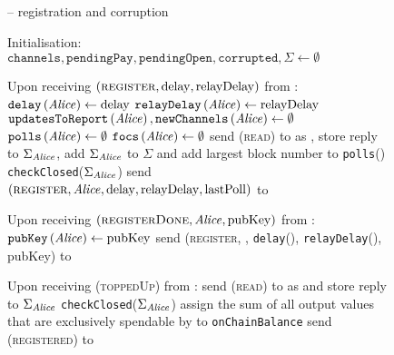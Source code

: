   \begin{figure}[H]
    \begin{systembox}{\fpaynet{} -- registration and corruption}
      \begin{algorithmic}[1]
        \State Initialisation:
        \Indent
          \State $\mathtt{channels}, \mathtt{pendingPay}, \mathtt{pendingOpen},
          \mathtt{corrupted}, \Sigma \gets \emptyset$
        \EndIndent
        \Statex

        \State Upon receiving $\left(\textsc{register}, \mathrm{delay},
        \mathrm{relayDelay}\right)$ from \alice:
        \Indent
          \State $\mathtt{delay}\left(\mathit{Alice}\right) \gets \mathrm{delay}$
          \State $\mathtt{relayDelay}\left(\mathit{Alice}\right) \gets
          \mathrm{relayDelay}$
          \State $\mathtt{updatesToReport}\left(\mathit{Alice}\right),
          \mathtt{newChannels}\left(\mathit{Alice}\right) \gets \emptyset$
          \State $\mathtt{polls}\left(\mathit{Alice}\right) \gets \emptyset$
          \State $\mathtt{focs}\left(\mathit{Alice}\right) \gets \emptyset$
          \State send (\textsc{read}) to \ledger{} as \alice{}, store reply to
          $\Sigma_{\mathit{Alice}}$, add $\Sigma_{\mathit{Alice}}$ to $\Sigma$ and add largest
          block number to \texttt{polls}(\alice)
          \label{alg:fpaynet:support:lastpoll}
          \State \texttt{checkClosed}($\Sigma_{\mathit{Alice}}$)
          \State send $\left(\textsc{register}, \mathit{Alice}, \mathrm{delay},
          \mathrm{relayDelay}, \mathrm{lastPoll}\right)$ to \simulator
        \EndIndent
        \Statex

        \State Upon receiving $\left(\textsc{registerDone}, \mathit{Alice},
        \mathrm{pubKey}\right)$ from \simulator:
        \Indent
          \State $\mathtt{pubKey}\left(\mathit{Alice}\right) \gets \mathrm{pubKey}$
          \State send (\textsc{register}, \alice, \texttt{delay}(\alice),
          \texttt{relayDelay}(\alice), pubKey) to \alice
        \EndIndent
        \Statex

        \State Upon receiving (\textsc{toppedUp}) from \alice:
        \Indent
          \State send (\textsc{read}) to \ledger{} as \alice{} and store reply
          to $\Sigma_{\mathit{Alice}}$
          \State \texttt{checkClosed}($\Sigma_{\mathit{Alice}}$)
          \State assign the sum of all output values that are exclusively
          spendable by \alice{} to \texttt{onChainBalance}
          \State send (\textsc{registered}) to \alice
        \EndIndent
        \Statex


\end{algorithmic}
\end{systembox}
\end{figure}
